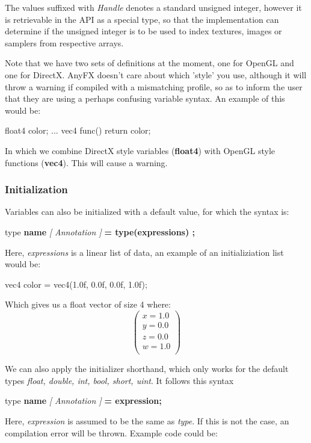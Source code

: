 \documentclass{article}
\newcommand{\SyntaxBox}[1]
{	
	\begin{center}
	\colorbox{orange!60}
	{
		\begin{minipage}{\linewidth}
		\hfill
		\begin{tabbing}
		#1
		\end{tabbing}
		\end{minipage}
	}
	\end{center}
}
\begin{document}
The values suffixed with \textit{Handle} denotes a standard unsigned integer, however it is retrievable in the API as a special type, so that the implementation can determine if the unsigned integer is to be used to index textures, images or samplers from respective arrays.

Note that we have two sets of definitions at the moment, one for OpenGL and one for DirectX. AnyFX doesn't care about which 'style' you use, although it will throw a warning if compiled with a mismatching profile, so as to inform the user that they are using a perhaps confusing variable syntax. An example of this would be:

\begin{CodeBox}
	float4 color;
	...
	vec4 func()
	{
		return color;
	}
\end{CodeBox}

In which we combine DirectX style variables (\textbf{float4}) with OpenGL style functions (\textbf{vec4}). This will cause a warning. 

\subsubsection{Initialization}
Variables can also be initialized with a default value, for which the syntax is:

\SyntaxBox
{
	type \textbf{name} \textit{[ Annotation ]} \textbf{= type(expressions) ;}
}

Here, \textit{expressions} is a linear list of data, an example of an initializiation list would be:

\begin{CodeBox}
	vec4 color = vec4(1.0f, 0.0f, 0.0f, 1.0f);
\end{CodeBox}

Which gives us a float vector of size 4 where:
\[
	\left(
	\begin{array}{c}
	x = 1.0 \\
	y = 0.0 \\ 
	z = 0.0 \\
	w = 1.0 \\
	\end{array}
	\right)
\]

We can also apply the initializer shorthand, which only works for the default types \textit{float, double, int, bool, short, uint}. It follows this syntax

\SyntaxBox
{
	type \textbf{name} \textit{[ Annotation ]} \textbf{= expression;}
}

Here, \textit{expression} is assumed to be the same as \textit{type}. If this is not the case, an compilation error will be thrown. Example code could be:
\end{document}
